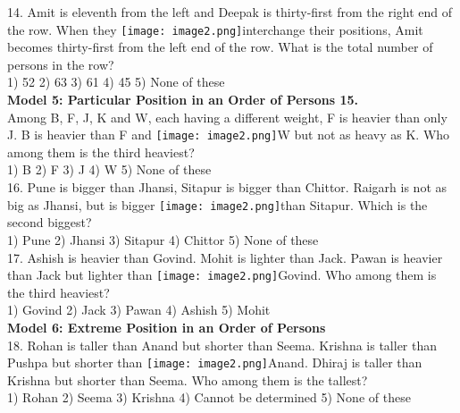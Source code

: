 \documentclass[
]{article}
\begin{document}
14. Amit is eleventh from the left and Deepak is thirty-first from the right end of the row. When they \texttt{[image: image2.png]}interchange their positions, Amit becomes thirty-first from the left end of the row. What is the total number of persons in the row?\\
1) 52 \hspace{2mm}2) 63 \hspace{2mm}3) 61 \hspace{2mm}4) 45 \hspace{2mm}5) None of these\\

\textbf{Model 5: Particular Position in an Order of Persons 15.}\\ 
Among B, F, J, K and W, each having a different weight, F is heavier than only J. B is heavier than F and \texttt{[image: image2.png]}W but not as heavy as K. Who among them is the third heaviest?\\
1) B \hspace{2mm}2) F \hspace{2mm}3) J \hspace{2mm}4) W \hspace{2mm}5) None of these\\

16. Pune is bigger than Jhansi, Sitapur is bigger than Chittor. Raigarh is not as big as Jhansi, but is bigger \texttt{[image: image2.png]}than Sitapur. Which is the second biggest?\\
1) Pune \hspace{2mm}2) Jhansi \hspace{2mm}3) Sitapur \hspace{2mm}4) Chittor \hspace{2mm}5) None of these\\

17. Ashish is heavier than Govind. Mohit is lighter than Jack. Pawan is heavier than Jack but lighter than \texttt{[image: image2.png]}Govind. Who among them is the third heaviest?\\
1) Govind \hspace{2mm}2) Jack \hspace{2mm}3) Pawan \hspace{2mm}4) Ashish \hspace{2mm}5) Mohit\\

\textbf{Model 6: Extreme Position in an Order of Persons}\\
18. Rohan is taller than Anand but shorter than Seema. Krishna is taller than Pushpa but shorter than \texttt{[image: image2.png]}Anand. Dhiraj is taller than Krishna but shorter than Seema. Who among them is the
tallest?\\
1) Rohan \hspace{2mm}2) Seema \hspace{2mm}3) Krishna
\hspace{2mm}4) Cannot be determined \hspace{2mm}5) None of these\\
\end{document}
